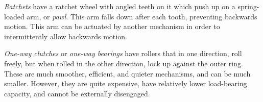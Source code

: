 \begin{asparaenum}[a)]
	\item \textit{Ratchets} have a ratchet wheel with angled teeth on it which push up on a spring-loaded arm, or \textit{pawl}. This arm falls down after each tooth, preventing backwards motion. This arm can be actuated by another mechanism in order to intermittently allow backwards motion.
	\item \textit{One-way clutches} or \textit{one-way bearings} have rollers that in one direction, roll freely, but when rolled in the other direction, lock up against the outer ring. These are much smoother, efficient, and quieter mechanisms, and can be much smaller. However, they are quite expensive, have relatively lower load-bearing capacity, and cannot be externally disengaged.
\end{asparaenum}


